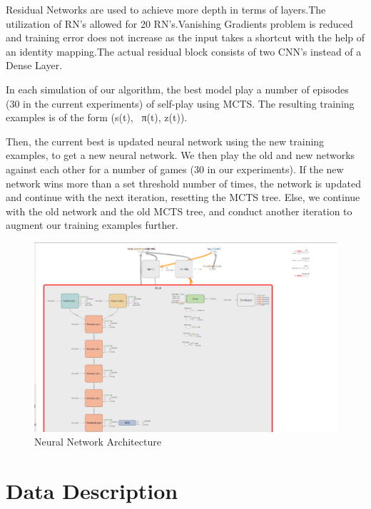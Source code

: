 \documentclass{article}
\begin{document}
    Residual Networks are used to achieve more depth in terms of layers.The utilization of RN’s allowed for 20 RN’s.Vanishing Gradients problem is reduced and training error does not increase as the input takes a shortcut with the help of an identity mapping.The actual residual block consists of two CNN’s instead of a Dense Layer.

    In each simulation of our algorithm, the best model play a number of episodes (30 in  the current experiments) of self-play using MCTS. The resulting training examples is of the form (s(t), ~π(t), z(t)).
    
    Then, the current best is updated  neural network using the new training examples, to get a new neural network. We then play the old and new networks against each other for a number of games (30 in our experiments). If the new network wins more than a set threshold number of times, the network is updated and continue with the next iteration, resetting the MCTS tree. Else, we continue with the old network and the old MCTS tree, and conduct another iteration to augment our training examples further.
    
\begin{figure}
    \centering
    \includegraphics[width=\textwidth, scale=0.5]{tensorflow.png}
    \caption{Neural Network Architecture}
    \label{fig:my_label}
\end{figure}    


\section{Data Description}
\end{document}
